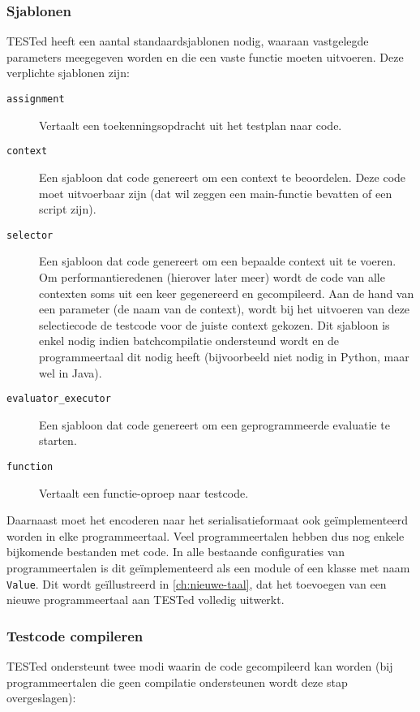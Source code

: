\subsubsection{Sjablonen}

TESTed heeft een aantal standaardsjablonen nodig, waaraan vastgelegde parameters meegegeven worden en die een vaste functie moeten uitvoeren.
Deze verplichte sjablonen zijn:
\begin{description}
    \item[\texttt{assignment}] Vertaalt een toekenningsopdracht uit het testplan naar code.
    \item[\texttt{context}] Een sjabloon dat code genereert om een context te beoordelen.
    Deze code moet uitvoerbaar zijn (dat wil zeggen een main-functie bevatten of een script zijn).
    \item[\texttt{selector}] Een sjabloon dat code genereert om een bepaalde context uit te voeren.
    Om performantieredenen (hierover later meer) wordt de code van alle contexten soms uit een keer gegenereerd en gecompileerd.
    Aan de hand van een parameter (de naam van de context), wordt bij het uitvoeren van deze selectiecode de testcode voor de juiste context gekozen.
    Dit sjabloon is enkel nodig indien batchcompilatie ondersteund wordt en de programmeertaal dit nodig heeft (bijvoorbeeld niet nodig in Python, maar wel in Java).
    \item[\texttt{evaluator\_executor}] Een sjabloon dat code genereert om een geprogrammeerde evaluatie te starten.
    \item[\texttt{function}] Vertaalt een functie-oproep naar testcode.
\end{description}

Daarnaast moet het encoderen naar het serialisatieformaat ook geïmplementeerd worden in elke programmeertaal.
Veel programmeertalen hebben dus nog enkele bijkomende bestanden met code.
In alle bestaande configuraties van programmeertalen is dit geïmplementeerd als een module of een klasse met naam \texttt{Value}.
Dit wordt geïllustreerd in \cref{ch:nieuwe-taal}, dat het toevoegen van een nieuwe programmeertaal aan TESTed volledig uitwerkt.

\subsubsection{Testcode compileren}

TESTed ondersteunt twee modi waarin de code gecompileerd kan worden (bij programmeertalen die geen compilatie ondersteunen wordt deze stap overgeslagen):

